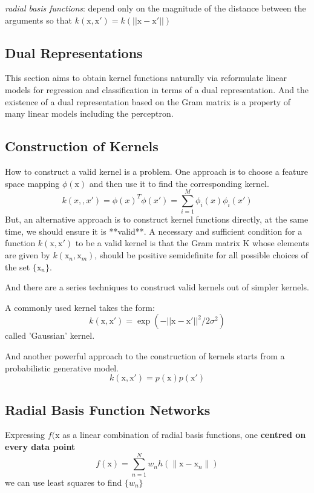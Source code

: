 \documentclass[a4paper]{book}
\begin{document}
\textit{radial basis functions}: depend only on the magnitude of the distance  between the arguments so that $k(\mathrm x,\mathrm x') = k(||\mathrm x-\mathrm x'||)$
\subsection{Dual Representations}
This section aims to obtain kernel functions naturally via reformulate linear models for regression and classification in terms of a dual representation.  And the existence of a dual representation based on the Gram matrix is a property of many linear models including the perceptron.
\subsection{ Construction of Kernels}
How to construct a valid kernel is a problem. One approach is to choose a feature space mapping $\phi(\mathrm x)$ and then use it to find the corresponding  kernel.
\begin{equation}
  k(x, ,x') = \phi(x)^T\phi(x') = \sum_{i=1}^M\phi_i(x)\phi_i(x')
\end{equation}
But, an alternative approach is to construct kernel functions directly, at the same time, we should ensure it is **valid**.  A necessary and sufficient condition for a function $k(\mathrm x, \mathrm  x') $ to be a valid kernel is that the Gram matrix $\mathrm  K$ whose elements are given by $k(\mathrm  x_n,\mathrm  x_m)$, should be positive semidefinite for all possible choices of the set $\{\mathrm  x_n\}$.

And there are a series techniques to construct valid kernels out of simpler kernels.

A commonly used kernel takes the form:
$$k(\mathrm  x,\mathrm  x') = \exp(-||\mathrm  x-\mathrm  x'||^2/2\sigma^2)$$
called 'Gaussian' kernel.

And another powerful approach to the construction of kernels starts from a probabilistic generative model.  $$k(\mathrm  x,\mathrm x') = p(\mathrm  x)p(\mathrm  x')$$
\subsection{Radial Basis Function Networks}
Expressing $f(\mathrm{x}$ as a linear combination of radial basis functions, one \textbf{centred on every data point}
\begin{equation}
  f(\mathrm{x})  = \sum_{n=1}^{N}w_nh(\parallel\mathrm{x}-\mathrm{x}_n\parallel)
\end{equation}
we can use least squares to find $\{w_n\}$
\end{document}
